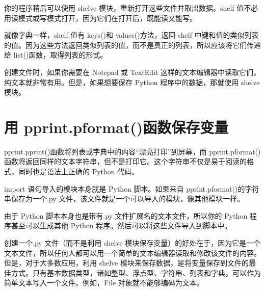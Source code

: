 你的程序稍后可以使用 shelve 模块，重新打开这些文件并取出数据。shelf 值不必用读模式或写模式打开，因为它们在打开后，既能读又能写。

就像字典一样，shelf 值有 keys()和 values()方法，返回 shelf 中键和值的类似列表的值。因为这些方法返回类似列表的值，而不是真正的列表，所以应该将它们传递给 list()函数，取得列表的形式。

创建文件时，如果你需要在 Notepad 或 TextEdit 这样的文本编辑器中读取它们，纯文本就非常有用。但是，如果想要保存 Python 程序中的数据，那就使用 shelve 模块。

\section{用 pprint.pformat()函数保存变量}
pprint.pprint()函数将列表或字典中的内容“漂亮打印”到屏幕，而 pprint.pformat()函数将返回同样的文本字符串，但不是打印它。这个字符串不仅是易于阅读的格式，同时也是语法上正确的 Python 代码。

import 语句导入的模块本身就是 Python 脚本。如果来自 pprint.pformat()的字符串保存为一个.py 文件，该文件就是一个可以导入的模块，像其他模块一样。

由于 Python 脚本本身也是带有.py 文件扩展名的文本文件，所以你的 Python 程序甚至可以生成其他 Python 程序。然后可以将这些文件导入到脚本中。

创建一个.py 文件（而不是利用 shelve 模块保存变量）的好处在于，因为它是一个文本文件，所以任何人都可以用一个简单的文本编辑器读取和修改该文件的内容。但是，对于大多数应用，利用 shelve 模块来保存数据，是将变量保存到文件的最佳方式。只有基本数据类型，诸如整型、浮点型、字符串、列表和字典，可以作为简单文本写入一个文件。例如，File 对象就不能够编码为文本。